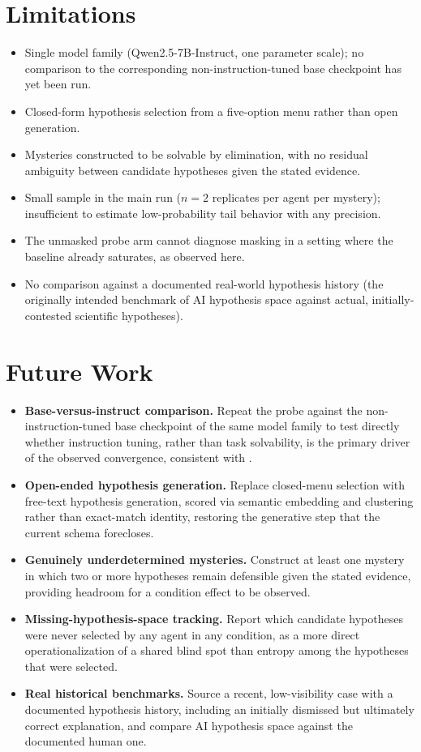 \documentclass[11pt]{article}
\begin{document}
\section{Limitations}
\begin{itemize}[leftmargin=1.4em]
\item Single model family (Qwen2.5-7B-Instruct, one parameter scale); no comparison to the
corresponding non-instruction-tuned base checkpoint has yet been run.
\item Closed-form hypothesis selection from a five-option menu rather than open generation.
\item Mysteries constructed to be solvable by elimination, with no residual ambiguity between
candidate hypotheses given the stated evidence.
\item Small sample in the main run ($n=2$ replicates per agent per mystery); insufficient to
estimate low-probability tail behavior with any precision.
\item The unmasked probe arm cannot diagnose masking in a setting where the baseline already
saturates, as observed here.
\item No comparison against a documented real-world hypothesis history (the originally intended
benchmark of AI hypothesis space against actual, initially-contested scientific hypotheses).
\end{itemize}

\section{Future Work}
\label{sec:future}
\begin{itemize}[leftmargin=1.4em]
\item \textbf{Base-versus-instruct comparison.} Repeat the probe against the non-instruction-tuned
base checkpoint of the same model family to test directly whether instruction tuning, rather than
task solvability, is the primary driver of the observed convergence, consistent with
\citep{kirk2023}.
\item \textbf{Open-ended hypothesis generation.} Replace closed-menu selection with free-text
hypothesis generation, scored via semantic embedding and clustering rather than exact-match
identity, restoring the generative step that the current schema forecloses.
\item \textbf{Genuinely underdetermined mysteries.} Construct at least one mystery in which two or
more hypotheses remain defensible given the stated evidence, providing headroom for a condition
effect to be observed.
\item \textbf{Missing-hypothesis-space tracking.} Report which candidate hypotheses were never
selected by any agent in any condition, as a more direct operationalization of a shared blind spot
than entropy among the hypotheses that were selected.
\item \textbf{Real historical benchmarks.} Source a recent, low-visibility case with a documented
hypothesis history, including an initially dismissed but ultimately correct explanation, and compare
AI hypothesis space against the documented human one.
\end{itemize}
\end{document}
